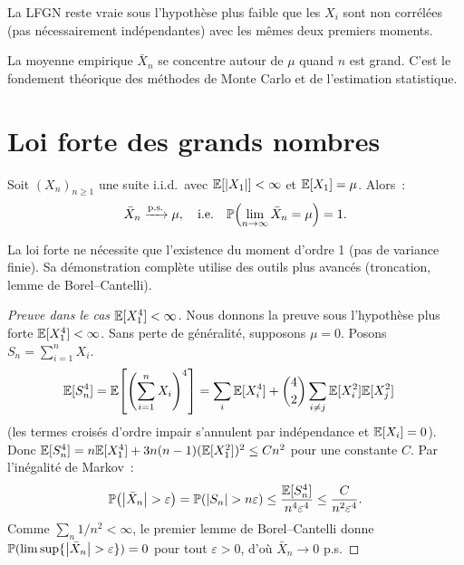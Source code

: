 \begin{remarque}
La LFGN reste vraie sous l'hypoth\`ese plus faible que les $X_i$ sont non corr\'el\'ees
(pas n\'ecessairement ind\'ependantes) avec les m\^emes deux premiers moments.
\end{remarque}

\begin{intuition}[title=\textbf{Signification de la LFGN}]
La moyenne empirique $\bar{X}_n$ se concentre autour de $\mu$ quand $n$ est grand.
C'est le fondement th\'eorique des m\'ethodes de Monte Carlo et de l'estimation
statistique.
\end{intuition}

\section{Loi forte des grands nombres}

\begin{theoreme}
\label{thm:lf_forte}
Soit $(X_n)_{n \geq 1}$ une suite i.i.d.\ avec $\mathbb{E}[\left| X_1 \right|] < \infty$ et
$\mathbb{E}[X_1] = \mu$. Alors~:
\[
    \bar{X}_n \xrightarrow{\text{p.s.}} \mu, \quad \text{i.e.} \quad
    \mathbb{P}\!\left(\lim_{n \to \infty} \bar{X}_n = \mu\right) = 1.
\]
\end{theoreme}

\begin{remarque}
La loi forte ne n\'ecessite que l'existence du moment d'ordre 1 (pas de variance
finie). Sa d\'emonstration compl\`ete utilise des outils plus avanc\'es (troncation,
lemme de Borel--Cantelli).
\end{remarque}

\begin{proof}[Preuve dans le cas $\mathbb{E}\lbrack X_1^4\rbrack < \infty$]
Nous donnons la preuve sous l'hypoth\`ese plus forte $\mathbb{E}[X_1^4] < \infty$.
Sans perte de g\'en\'eralit\'e, supposons $\mu = 0$. Posons $S_n = \sum_{i=1}^n X_i$.
\begin{align*}
    \mathbb{E}[S_n^4] &= \mathbb{E}\!\left[\left(\sum_{i=1}^n X_i\right)^4\right]
    = \sum_{i} \mathbb{E}[X_i^4] + \binom{4}{2}\sum_{i \neq j} \mathbb{E}[X_i^2]\mathbb{E}[X_j^2]
\end{align*}
(les termes crois\'es d'ordre impair s'annulent par ind\'ependance et $\mathbb{E}[X_i] = 0$).
Donc $\mathbb{E}[S_n^4] = n\mathbb{E}[X_1^4] + 3n(n-1)(\mathbb{E}[X_1^2])^2 \leq Cn^2$ pour une constante $C$.
Par l'in\'egalit\'e de Markov~:
\[
    \mathbb{P}\!\left(\left| \bar{X}_n \right| > \varepsilon\right)
    = \mathbb{P}\!\left(\left| S_n \right| > n\varepsilon\right)
    \leq \frac{\mathbb{E}[S_n^4]}{n^4\varepsilon^4}
    \leq \frac{C}{n^2\varepsilon^4}.
\]
Comme $\sum_n 1/n^2 < \infty$, le premier lemme de Borel--Cantelli donne
$\mathbb{P}(\limsup\{\left| \bar{X}_n \right| > \varepsilon\}) = 0$ pour tout $\varepsilon > 0$,
d'o\`u $\bar{X}_n \to 0$ p.s.
\end{proof}

